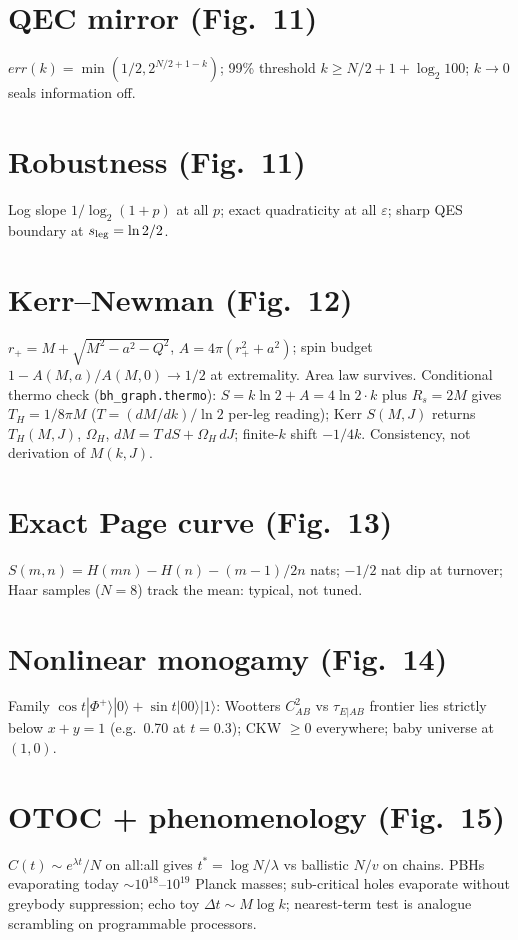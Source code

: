 \documentclass[11pt]{article}
\begin{document}
\section{QEC mirror (Fig.~11)}
$err(k)=\min(1/2,2^{N/2+1-k})$; 99\% threshold
$k\ge N/2+1+\log_2 100$; $k\to0$ seals information off.

\section{Robustness (Fig.~11)}
Log slope $1/\log_2(1+p)$ at all $p$; exact quadraticity at all $\varepsilon$;
sharp QES boundary at $s_{\rm leg}=\ln2/2$.

\section{Kerr--Newman (Fig.~12)}
$r_+=M+\sqrt{M^2-a^2-Q^2}$, $A=4\pi(r_+^2+a^2)$; spin budget
$1-A(M,a)/A(M,0)\to1/2$ at extremality. Area law survives.
Conditional thermo check (\texttt{bh\_graph.thermo}): $S=k\ln2+A=4\ln2\cdot k$
plus $R_s=2M$ gives $T_H=1/8\pi M$ ($T=(dM/dk)/\ln2$ per-leg reading); Kerr
$S(M,J)$ returns $T_H(M,J)$, $\Omega_H$, $dM=T\,dS+\Omega_H\,dJ$; finite-$k$
shift $-1/4k$. Consistency, not derivation of $M(k,J)$.

\section{Exact Page curve (Fig.~13)}
$S(m,n)=H(mn)-H(n)-(m-1)/2n$ nats; $-1/2$ nat dip at turnover; Haar samples
($N=8$) track the mean: typical, not tuned.

\section{Nonlinear monogamy (Fig.~14)}
Family $\cos t|\Phi^+\rangle|0\rangle+\sin t|00\rangle|1\rangle$: Wootters
$C^2_{AB}$ vs $\tau_{E|AB}$ frontier lies strictly below $x+y=1$ (e.g.\ 0.70
at $t=0.3$); CKW $\ge0$ everywhere; baby universe at $(1,0)$.

\section{OTOC + phenomenology (Fig.~15)}
$C(t)\sim e^{\lambda t}/N$ on all:all gives $t^*=\log N/\lambda$ vs ballistic
$N/v$ on chains. PBHs evaporating today $\sim10^{18}$--$10^{19}$ Planck masses;
sub-critical holes evaporate without greybody suppression; echo toy
$\Delta t\sim M\log k$; nearest-term test is analogue scrambling on
programmable processors.
\end{document}
